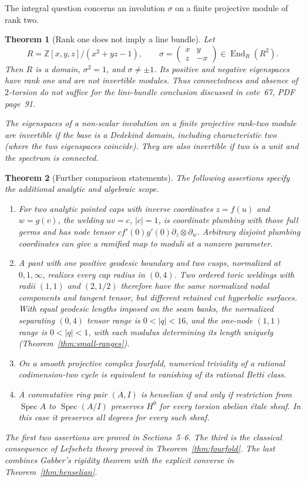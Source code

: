\documentclass[11pt,a4paper]{article}
\newtheorem{theorem}{Theorem}[section]
\theoremstyle{definition}
\newcommand{\Spec}{\operatorname{Spec}}
\newcommand{\Z}{\mathbb Z}
\begin{document}
The integral question concerns an involution $\sigma$ on a finite projective module of rank two.
\begin{theorem}[Rank one does not imply a line bundle]\label{thm:eigen}
Let
\[
 R=\Z[x,y,z]/(x^2+yz-1),\qquad
 \sigma=\begin{pmatrix}x&y\\z&-x\end{pmatrix}\in\operatorname{End}_R(R^2).
\]
Then $R$ is a domain, $\sigma^2=1$, and $\sigma\ne\pm1$. Its positive and negative eigenspaces have rank one and are not invertible modules. Thus connectedness and absence of $2$-torsion do not suffice for the line-bundle conclusion discussed in cote~67, PDF page~91.

The eigenspaces of a non-scalar involution on a finite projective rank-two module are invertible if the base is a Dedekind domain, including characteristic two (where the two eigenspaces coincide). They are also invertible if two is a unit and the spectrum is connected.
\end{theorem}

\begin{theorem}[Further comparison statements]\label{thm:comparisons}
The following assertions specify the additional analytic and algebraic scope.
\begin{enumerate}
\item For two analytic pointed caps with inverse coordinates $z=f(u)$ and $w=g(v)$, the welding $uv=c$, $|c|=1$, is coordinate plumbing with those full germs and has node tensor $c f'(0)g'(0)\partial_z\otimes\partial_w$. Arbitrary disjoint plumbing coordinates can give a ramified map to moduli at a nonzero parameter.
\item A pant with one positive geodesic boundary and two cusps, normalized at $0,1,\infty$, realizes every cap radius in $(0,4)$. Two ordered toric weldings with radii $(1,1)$ and $(2,1/2)$ therefore have the same normalized nodal components and tangent tensor, but different retained cut hyperbolic surfaces. With equal geodesic lengths imposed on the seam banks, the normalized separating $(0,4)$ tensor range is $0<|q|<16$, and the one-node $(1,1)$ range is $0<|q|<1$, with each modulus determining its length uniquely (Theorem~\ref{thm:small-ranges}).
\item On a smooth projective complex fourfold, numerical triviality of a rational codimension-two cycle is equivalent to vanishing of its rational Betti class.
\item A commutative ring pair $(A,I)$ is henselian if and only if restriction from $\Spec A$ to $\Spec(A/I)$ preserves $H^0$ for every torsion abelian étale sheaf. In this case it preserves all degrees for every such sheaf.
\end{enumerate}
The first two assertions are proved in Sections~5--6. The third is the classical consequence of Lefschetz theory proved in Theorem~\ref{thm:fourfold}. The last combines Gabber's rigidity theorem with the explicit converse in Theorem~\ref{thm:henselian}.
\end{theorem}
\end{document}

